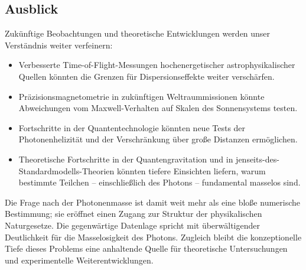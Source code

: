 \subsection*{Ausblick}

Zukünftige Beobachtungen und theoretische Entwicklungen 
werden unser Verständnis weiter verfeinern:

\begin{itemize}
	\item Verbesserte Time-of-Flight-Messungen hochenergetischer 
	astrophysikalischer Quellen könnten die Grenzen für 
	Dispersions­effekte weiter verschärfen.
	\item Präzisionsmagnetometrie in zukünftigen 
	Weltraummissionen könnte Abweichungen vom 
	Maxwell-Verhalten auf Skalen des Sonnensystems testen.
	\item Fortschritte in der Quanten­technologie könnten neue 
	Tests der Photonenhelizität und der Verschränkung über 
	große Distanzen ermöglichen.
	\item Theoretische Fortschritte in der Quantengravitation 
	und in jenseits-des-Standardmodells-Theorien könnten 
	tiefere Einsichten liefern, warum bestimmte Teilchen – 
	einschließlich des Photons – fundamental masselos sind.
\end{itemize}

Die Frage nach der Photonenmasse ist damit weit mehr als eine 
bloße numerische Bestimmung; sie eröffnet einen Zugang zur 
Struktur der physikalischen Naturgesetze. Die gegenwärtige 
Datenlage spricht mit überwältigender Deutlichkeit für die 
Masselosigkeit des Photons. Zugleich bleibt die konzeptionelle 
Tiefe dieses Problems eine anhaltende Quelle für theoretische 
Untersuchungen und experimentelle Weiterentwicklungen.

